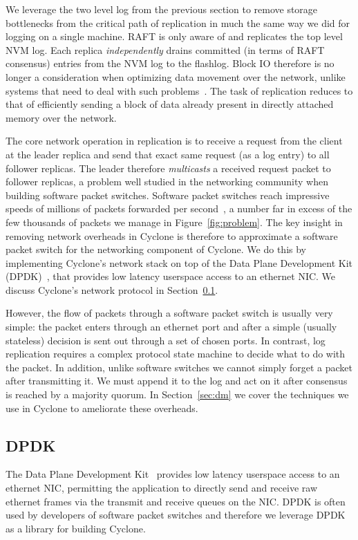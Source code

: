 \documentclass[twocolumn]{article}
\begin{document}
We leverage the two level log from the previous section to remove storage
bottlenecks from the critical path of replication in much the same way we did
for logging on a single machine. RAFT is only aware of and replicates the top
level NVM log. Each replica \emph{independently} drains committed (in terms of
RAFT consensus) entries from the NVM log to the flashlog. Block IO therefore is
no longer a consideration when optimizing data movement over the network, unlike
systems that need to deal with such problems~\cite{reflex}. The task of
replication reduces to that of efficiently sending a block of data already
present in directly attached memory over the network. 

The core network operation in replication is to receive a request from the
client at the leader replica and send that exact same request (as a log entry)
to all follower replicas. The leader therefore \emph{multicasts} a received
request packet to follower replicas, a problem well studied in the networking
community when building software packet switches. Software packet switches reach
impressive speeds of millions of packets forwarded per second~\cite{dpdk_perf}, 
a number far in excess of the few thousands of packets we manage in
Figure~\ref{fig:problem}. The key insight in removing network overheads in
Cyclone is therefore to approximate a software packet switch for the networking
component of Cyclone. We do this by implementing Cyclone's network stack on top
of the Data Plane Development Kit (DPDK)~\cite{dpdk}, that provides low latency
userspace access to an ethernet NIC. We discuss Cyclone's network protocol in
Section~\ref{sec:netprot}.

However, the flow of packets through a software packet switch is usually very
simple: the packet enters through an ethernet port and after a simple (usually
stateless) decision is sent out through a set of chosen ports.  In contrast, log
replication requires a complex protocol state machine to decide what to do with
the packet. In addition, unlike software switches we cannot simply forget a
packet after transmitting it. We must append it to the log and act on it after
consensus is reached by a majority quorum. In Section~\ref{sec:dm} we cover the
techniques we use in Cyclone to ameliorate these overheads.

\subsection{DPDK}
\label{sec:netprot}
The Data Plane Development Kit~\cite{dpdk} provides low latency userspace access
to an ethernet NIC, permitting the application to directly send and receive raw
ethernet frames via the transmit and receive queues on the NIC. DPDK is often
used by developers of software packet switches and therefore we leverage
DPDK as a library for building Cyclone.
\end{document}
